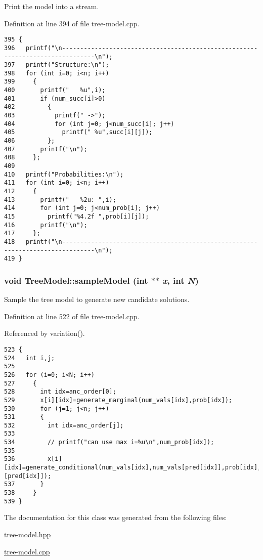 Print the model into a stream. 



Definition at line 394 of file tree-model.cpp.

\begin{Code}\begin{verbatim}395 {
396   printf("\n-------------------------------------------------------------------------------\n");
397   printf("Structure:\n");
398   for (int i=0; i<n; i++)
399     {
400       printf("   %u",i);
401       if (num_succ[i]>0)
402         {
403           printf(" ->");
404           for (int j=0; j<num_succ[i]; j++)
405             printf(" %u",succ[i][j]);
406         };
407       printf("\n");
408     };
409 
410   printf("Probabilities:\n");
411   for (int i=0; i<n; i++)
412     {
413       printf("   %2u: ",i);
414       for (int j=0; j<num_prob[i]; j++)
415         printf("%4.2f ",prob[i][j]);
416       printf("\n");
417     };
418   printf("\n-------------------------------------------------------------------------------\n");
419 }
\end{verbatim}\end{Code}


\hypertarget{class_tree_model_37e0258535bee44a401ac41f73725122}{
\subsubsection[sampleModel]{\setlength{\rightskip}{0pt plus 5cm}void Tree\-Model::sample\-Model (int $\ast$$\ast$ {\em x}, int {\em N})}}
\label{class_tree_model_37e0258535bee44a401ac41f73725122}


Sample the tree model to generate new candidate solutions. 



Definition at line 522 of file tree-model.cpp.

Referenced by variation().

\begin{Code}\begin{verbatim}523 {
524   int i,j;
525 
526   for (i=0; i<N; i++)
527     {
528       int idx=anc_order[0];
529       x[i][idx]=generate_marginal(num_vals[idx],prob[idx]);
530       for (j=1; j<n; j++)
531       {
532         int idx=anc_order[j];
533 
534         // printf("can use max i=%u\n",num_prob[idx]);
535 
536         x[i][idx]=generate_conditional(num_vals[idx],num_vals[pred[idx]],prob[idx],x[i][pred[idx]]);
537       }
538     }
539 }
\end{verbatim}\end{Code}




The documentation for this class was generated from the following files:\begin{CompactItemize}
\item 
\hyperlink{tree-model_8hpp}{tree-model.hpp}\item 
\hyperlink{tree-model_8cpp}{tree-model.cpp}\end{CompactItemize}
